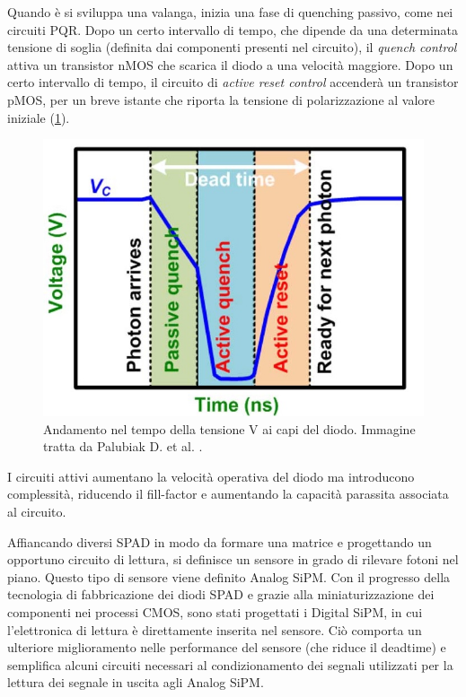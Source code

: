 Quando è si sviluppa una valanga, inizia una fase di quenching passivo, come nei circuiti PQR. Dopo un certo intervallo di tempo, che dipende da una determinata tensione di soglia (definita dai componenti presenti nel circuito), il \textit{quench control} attiva un transistor nMOS che scarica il diodo a una velocità maggiore. Dopo un certo intervallo di tempo, il circuito di \textit{active reset control} accenderà un transistor pMOS, per un breve istante che riporta la tensione di polarizzazione al valore iniziale (\Fig\ref{fig:aqr_2}).
\begin{figure}[tbh]
	\centering
	\includegraphics[width=0.6\linewidth]{./ImageFiles/aqr_2.jpg}
	\caption{Andamento nel tempo della tensione V ai capi del diodo. Immagine tratta da Palubiak D. et al. \cite{Palubiak2011}.}
	\label{fig:aqr_2}
\end{figure} 
I circuiti attivi aumentano la velocità operativa del diodo ma introducono complessità, riducendo il fill-factor e aumentando la capacità parassita associata al circuito.

Affiancando diversi SPAD in modo da formare una matrice e progettando un opportuno circuito di lettura, si definisce un sensore in grado di rilevare fotoni nel piano. Questo tipo di sensore viene definito Analog SiPM. Con il progresso della tecnologia di fabbricazione dei diodi SPAD e grazie alla miniaturizzazione dei componenti nei processi CMOS, sono stati progettati i Digital SiPM, in cui l'elettronica di lettura è direttamente inserita nel sensore. Ciò comporta un ulteriore miglioramento nelle performance del sensore (che riduce il deadtime) e semplifica alcuni circuiti necessari al condizionamento dei segnali utilizzati per la lettura dei segnale in uscita agli Analog SiPM.

\clearpage
